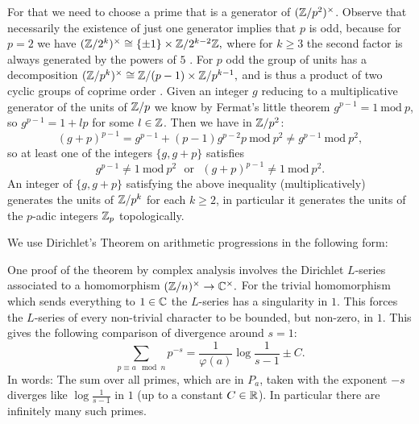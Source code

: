 For that we need to choose a prime that is a generator 
of $(\mathbb{Z}/p^2)^\times$. Observe that necessarily the existence of just 
one generator implies that $p$ is odd, because for $p=2$ we have 
$(\mathbb{Z}/2^k)^\times\cong\{\pm 1\}\times\mathbb{Z}/2^{k-2}\mathbb{Z},$ where for $k\geq 3$ 
the second factor is always generated by the powers of $5$ 
\cite[Art. 91, p. 89 - Latin edn.]{Gauss}. 
For $p$ odd the group of units has a 
decomposition $(\mathbb{Z}/p^k)^\times \cong \mathbb{Z}/(p-1)\times \mathbb{Z}/p^{k-1},$ 
and is thus a product of two cyclic groups of coprime order 
\cite[Art. 84, p. 82 - Latin edn.]{Gauss}. Given an integer $g$ reducing
to a multiplicative generator of the units of $\mathbb{Z}/p$ we know by 
Fermat's little theorem $g^{p-1}=1~ \mathrm{mod}~ p$, so 
$g^{p-1}=1+lp$ for some $l\in\mathbb{Z}$. Then we have in $\mathbb{Z}/p^2$: 
\[(g+p)^{p-1}=g^{p-1}+(p-1)g^{p-2}p \mathrm{~mod~}p^2\neq g^{p-1}
\mathrm{~mod~}p^2,\] so at least one of the integers $\{g,g+p\}$ 
satisfies \[g^{p-1}\neq 1 \mathrm{~mod~}p^2~~~ \mathrm{or}~~~(g+p)^{p-1}\neq 1\mathrm{~mod~} 
p^2.\] An integer of $\{g,g+p\}$ satisfying the above inequality 
(multiplicatively) generates the units of $\mathbb{Z}/p^k$ for each $k\geq 2$, 
in particular it generates the units of the $p$-adic integers $\mathbb{Z}_p$ 
topologically.

We use Dirichlet's Theorem on arithmetic progressions
in the following form:
{}

{}

One proof of the theorem by complex analysis involves the Dirichlet 
$L$-series associated to a homomorphism $(\mathbb{Z}/n)^\times \rightarrow 
\mathbb{C}^\times.$ For the trivial homomorphism which sends everything 
to $1\in\mathbb{C}$ the $L$-series has a singularity in $1$. This forces 
the $L$-series of every non-trivial character to be bounded, 
but non-zero, in $1$. This gives the following comparison of 
divergence around $s=1$: 
\[\sum_{p\equiv a \mod n}p^{-s}=\frac1{\varphi(a)}\log\frac1{s-1}\pm C.\] 
In words: The sum over all primes, which are in $P_a$, 
taken with the exponent $-s$ diverges like $\log\frac1{s-1}$ 
in $1$ (up to a constant $C\in \mathbb{R}$). In particular there are 
infinitely many such primes.

